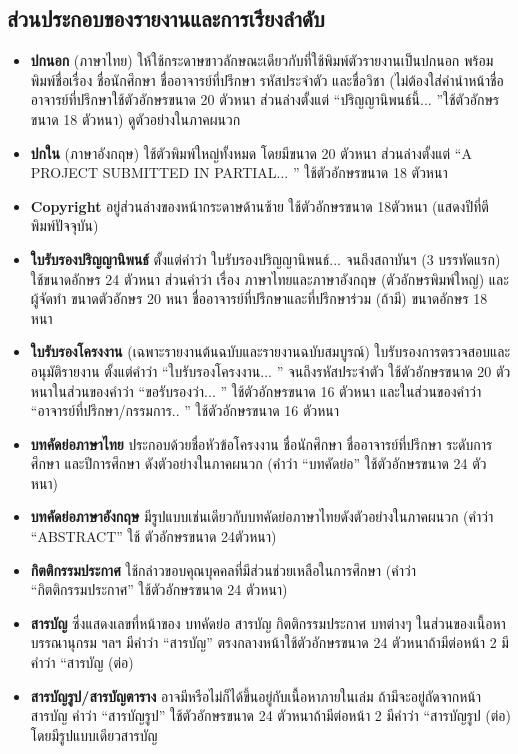 \subsection{ส่วนประกอบของรายงานและการเรียงลำดับ}
\begin{itemize}
    \item \textbf{ปกนอก} (ภาษาไทย) ให้ใช้กระดาษขาวลักษณะเดียวกับที่ใช้พิมพ์ตัวรายงานเป็นปกนอก พร้อมพิมพ์ชื่อเรื่อง ชื่อนักศึกษา ชื่ออาจารย์ที่ปรึกษา รหัสประจำตัว และชื่อวิชา (ไม่ต้องใส่คำนำหน้าชื่อ อาจารย์ที่ปรึกษาใช้ตัวอักษรขนาด 20 ตัวหนา ส่วนล่างตั้งแต่ ``ปริญญานิพนธ์นี้... ''ใช้ตัวอักษรขนาด 18 ตัวหนา) ดูตัวอย่างในภาคผนวก
    \item \textbf{ปกใน} (ภาษาอังกฤษ) ใช้ตัวพิมพ์ใหญ่ทั้งหมด โดยมีขนาด 20 ตัวหนา ส่วนล่างตั้งแต่ ``A PROJECT SUBMITTED IN PARTIAL... '' ใช้ตัวอักษรขนาด 18 ตัวหนา
    \item \textbf{Copyright} อยู่ส่วนล่างของหน้ากระดาษด้านซ้าย ใช้ตัวอักษรขนาด 18ตัวหนา (แสดงปีที่ตีพิมพ์ปัจจุบัน)
    \item \textbf{ใบรับรองปริญญานิพนธ์} ตั้งแต่คำว่า ใบรับรองปริญญานิพนธ์... จนถึงสถาบันฯ (3 บรรทัดแรก) ใช้ขนาดอักษร 24 ตัวหนา ส่วนคำว่า เรื่อง ภาษาไทยและภาษาอังกฤษ (ตัวอักษรพิมพ์ใหญ่) และผู้จัดทำ ขนาดตัวอักษร 20 หนา ชื่ออาจารย์ที่ปรึกษาและที่ปรึกษาร่วม (ถ้ามี) ขนาดอักษร 18 หนา
    \item \textbf{ใบรับรองโครงงาน} (เฉพาะรายงานต้นฉบับและรายงานฉบับสมบูรณ์) ใบรับรองการตรวจสอบและอนุมัติรายงาน ตั้งแต่คำว่า ``ใบรับรองโครงงาน... '' จนถึงรหัสประจำตัว ใช้ตัวอักษรขนาด 20 ตัวหนาในส่วนของคำว่า ``ขอรับรองว่า... '' ใช้ตัวอักษรขนาด 16 ตัวหนา และในส่วนของคำว่า ``อาจารย์ที่ปรึกษา/กรรมการ.. '' ใช้ตัวอักษรขนาด 16 ตัวหนา
    \item \textbf{บทคัดย่อภาษาไทย} ประกอบด้วยชื่อหัวข้อโครงงาน ชื่อนักศึกษา ชื่ออาจารย์ที่ปรึกษา ระดับการศึกษา และปีการศึกษา ดังตัวอย่างในภาคผนวก (คำว่า ``บทคัดย่อ'' ใช้ตัวอักษรขนาด 24 ตัวหนา)
    \item \textbf{บทคัดย่อภาษาอังกฤษ} มีรูปแบบเช่นเดียวกับบทคัดย่อภาษาไทยดังตัวอย่างในภาคผนวก (คำว่า ``ABSTRACT'' ใช้ ตัวอักษรขนาด 24ตัวหนา)
    \item \textbf{กิตติกรรมประกาศ} ใช้กล่าวขอบคุณบุคคลที่มีส่วนช่วยเหลือในการศึกษา (คำว่า ``กิตติกรรมประกาศ'' ใช้ตัวอักษรขนาด 24 ตัวหนา)
    \item \textbf{สารบัญ} ซึ่งแสดงเลขที่หน้าของ บทคัดย่อ สารบัญ กิตติกรรมประกาศ บทต่างๆ ในส่วนของเนื้อหา บรรณานุกรม ฯลฯ มีคำว่า ``สารบัญ'' ตรงกลางหน้าใช้ตัวอักษรขนาด 24 ตัวหนาถ้ามีต่อหน้า 2 มีคำว่า ``สารบัญ (ต่อ)
    \item \textbf{สารบัญรูป/สารบัญตาราง} อาจมีหรือไม่ก็ได้ขึ้นอยู่กับเนื้อหาภายในเล่ม ถ้ามีจะอยู่ถัดจากหน้าสารบัญ คำว่า ``สารบัญรูป'' ใช้ตัวอักษรขนาด 24 ตัวหนาถ้ามีต่อหน้า 2 มีคำว่า ``สารบัญรูป (ต่อ) โดยมีรูปแบบเดียวสารบัญ

\end{itemize}
